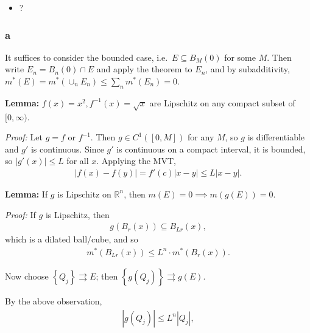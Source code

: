 \begin{solution}

\hfill

\begin{concept}

\hfill

\begin{itemize}
\tightlist
\item
  ?
\end{itemize}

\end{concept}

\hypertarget{a-4}{%
\subsubsection{a}\label{a-4}}

It suffices to consider the bounded case, i.e.~\(E \subseteq B_M(0)\)
for some \(M\). Then write \(E_n = B_n(0) \cap E\) and apply the theorem
to \(E_n\), and by subadditivity,
\(m^*(E) = m^*(\cup_n E_n) \leq \sum_n m^*(E_n) = 0\).

\textbf{Lemma:} \(f(x) = x^2, f^{-1}(x) = \sqrt{x}\) are Lipschitz on
any compact subset of \([0, \infty)\).

\emph{Proof:} Let \(g = f\) or \(f^{-1}\). Then \(g\in C^1([0, M])\) for
any \(M\), so \(g\) is differentiable and \(g'\) is continuous. Since
\(g'\) is continuous on a compact interval, it is bounded, so
\({\left\lvert {g'(x)} \right\rvert} \leq L\) for all \(x\). Applying
the MVT,
\begin{align*}
{\left\lvert {f(x) - f(y)} \right\rvert} = f'(c) {\left\lvert {x-y} \right\rvert} \leq L {\left\lvert {x-y} \right\rvert}
.\end{align*}

\textbf{Lemma:} If \(g\) is Lipschitz on \({\mathbb{R}}^n\), then
\(m(E) = 0 \implies m(g(E)) = 0\).

\emph{Proof:} If \(g\) is Lipschitz, then
\begin{align*}
g(B_r(x)) \subseteq B_{Lr}(x)
,\end{align*}
which is a dilated ball/cube, and so
\begin{align*}
m^*(B_{Lr}(x)) \leq L^n \cdot m^*(B_{r}(x))
.\end{align*}

Now choose \(\left\{{Q_j}\right\} \rightrightarrows E\); then
\(\left\{{g(Q_j)}\right\} \rightrightarrows g(E)\).

By the above observation,
\begin{align*}
{\left\lvert {g(Q_j)} \right\rvert} \leq L^n {\left\lvert {Q_j} \right\rvert}
,\end{align*}


\end{solution}
